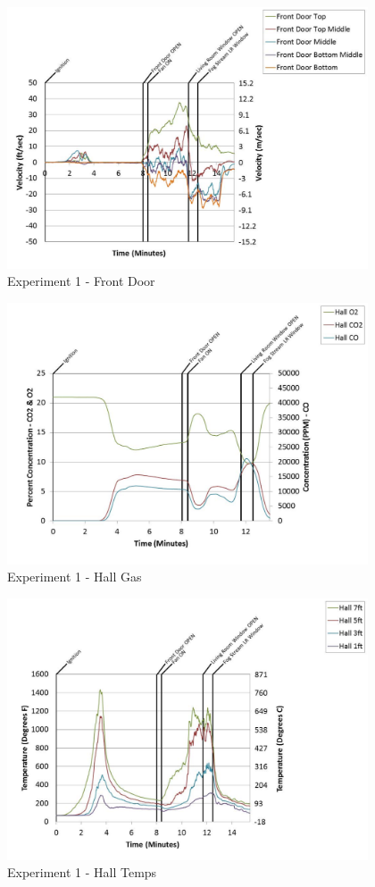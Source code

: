 \documentclass{article}
\begin{document}
\begin{appendices}
	\begin{figure}[h!]
		\centering
		\includegraphics[height=3.05in]{0_Images/Results_Charts/Exp_1_Charts/FrontDoor.pdf}
		\caption{Experiment 1 - Front Door}
	\end{figure}
 
	\clearpage

	\begin{figure}[h!]
		\centering
		\includegraphics[height=3.05in]{0_Images/Results_Charts/Exp_1_Charts/HallGas.pdf}
		\caption{Experiment 1 - Hall Gas}
	\end{figure}
 

	\begin{figure}[h!]
		\centering
		\includegraphics[height=3.05in]{0_Images/Results_Charts/Exp_1_Charts/HallTemps.pdf}
		\caption{Experiment 1 - Hall Temps}
	\end{figure}
 

\end{appendices}
\end{document}
